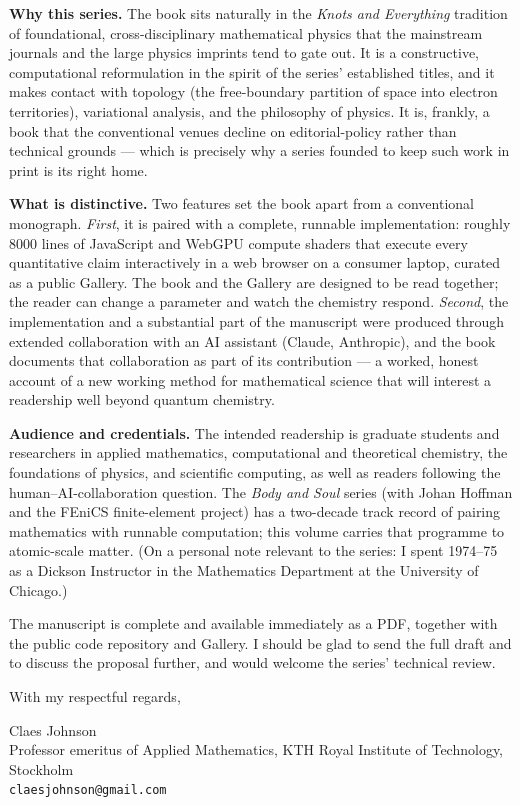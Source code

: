 \documentclass[11pt]{article}
\begin{document}
\medskip
\noindent\textbf{Why this series.}
The book sits naturally in the \emph{Knots and Everything} tradition of
foundational, cross-disciplinary mathematical physics that the mainstream
journals and the large physics imprints tend to gate out. It is a constructive,
computational reformulation in the spirit of the series' established titles,
and it makes contact with topology (the free-boundary partition of space into
electron territories), variational analysis, and the philosophy of physics. It
is, frankly, a book that the conventional venues decline on editorial-policy
rather than technical grounds --- which is precisely why a series founded to
keep such work in print is its right home.

\medskip
\noindent\textbf{What is distinctive.}
Two features set the book apart from a conventional monograph. \emph{First}, it
is paired with a complete, runnable implementation: roughly 8000 lines of
JavaScript and WebGPU compute shaders that execute every quantitative claim
interactively in a web browser on a consumer laptop, curated as a public
Gallery. The book and the Gallery are designed to be read together; the reader
can change a parameter and watch the chemistry respond. \emph{Second}, the
implementation and a substantial part of the manuscript were produced through
extended collaboration with an AI assistant (Claude, Anthropic), and the book
documents that collaboration as part of its contribution --- a worked, honest
account of a new working method for mathematical science that will interest a
readership well beyond quantum chemistry.

\medskip
\noindent\textbf{Audience and credentials.}
The intended readership is graduate students and researchers in applied
mathematics, computational and theoretical chemistry, the foundations of
physics, and scientific computing, as well as readers following the
human--AI-collaboration question. The \emph{Body and Soul} series (with Johan
Hoffman and the FEniCS finite-element project) has a two-decade track record of
pairing mathematics with runnable computation; this volume carries that
programme to atomic-scale matter. (On a personal note relevant to the series:
I spent 1974--75 as a Dickson Instructor in the Mathematics Department at the
University of Chicago.)

The manuscript is complete and available immediately as a PDF, together with
the public code repository and Gallery. I should be glad to send the full draft
and to discuss the proposal further, and would welcome the series' technical
review.

\medskip

\noindent With my respectful regards,

\vspace{1.5em}

\noindent Claes Johnson \\
Professor emeritus of Applied Mathematics, KTH Royal Institute of Technology, Stockholm \\
\texttt{claesjohnson@gmail.com}
\end{document}
